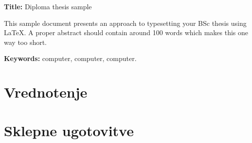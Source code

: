 \documentclass[a4paper, 12pt]{book}
\newcommand{\ttitleEn}{Diploma thesis sample}
\newcommand{\tkeywordsEn}{computer, computer, computer}
\newcommand{\clearemptydoublepage}{\newpage{\pagestyle{empty}\cleardoublepage}}
\begin{document}
\noindent\textbf{Title:} \ttitleEn
\bigskip

\noindent This sample document presents an approach to typesetting your BSc thesis using \LaTeX. A proper abstract should contain around 100 words which makes this one way too short.
\bigskip

\noindent\textbf{Keywords:} \tkeywordsEn.
\clearemptydoublepage

\mainmatter
\setcounter{page}{1}
\pagestyle{fancy}







\chapter{Vrednotenje}
\label{ch:bench}

\chapter{Sklepne ugotovitve}


\label{ch:literatura}

\end{document}
